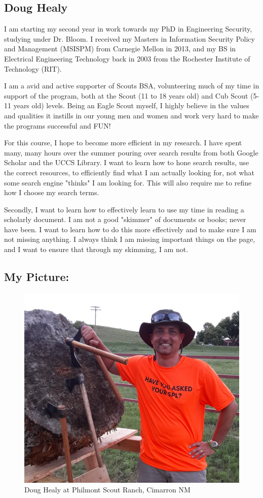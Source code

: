 \subsection{Doug Healy}

I am starting my second year in work towards my PhD in Engineering Security, studying under Dr. Bloom. I received my Masters in Information Security Policy and Management (MSISPM) from Carnegie Mellon in 2013, and my BS in Electrical Engineering Technology back in 2003 from the Rochester Institute of Technology (RIT). 

I am a avid and active supporter of Scouts BSA, volunteering much of my time in support of the program, both at the Scout (11 to 18 years old) and Cub Scout (5-11 years old) levels. Being an Eagle Scout myself, I highly believe in the values and qualities it instills in our young men and women and work very hard to make the programs successful and FUN!  

For this course, I hope to become more efficient in my research. I have spent many, many hours over the summer pouring over search results from both Google Scholar and the UCCS Library. I want to learn how to hone search results, use the correct resources, to efficiently find what I am actually looking for, not what some search engine "thinks" I am looking for. This will also require me to refine how I choose my search terms.  

Secondly, I want to learn how to effectively learn to use my time in reading a scholarly document. I am not a good "skimmer" of documents or books; never have been. I want to learn how to do this more effectively and to make sure I am not missing anything. I always think I am missing important things on the page, and I want to ensure that through my skimming, I am not.   

\subsection{My Picture: }
\begin{figure}[htp]
    \centering
    \includegraphics[scale=.095]{Healy.jpg}
    \caption{Doug Healy at Philmont Scout Ranch, Cimarron NM}
 \end{figure}
